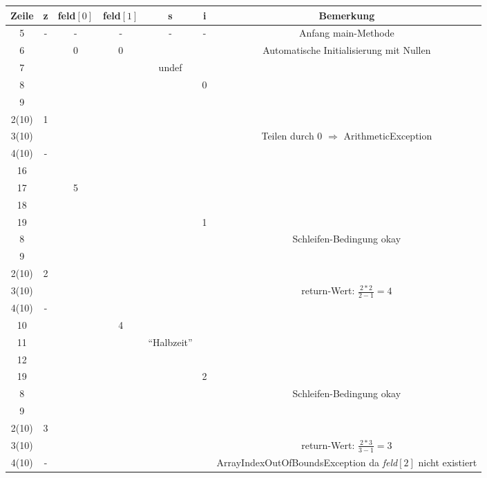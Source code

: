\documentclass{scrartcl}
\begin{document}
\begin{center}
\begin{tabular}{ccccccc} %
	\toprule
	Zeile	& z	& feld$\left[0\right]$	& feld$\left[1\right]$	& s				& i	& Bemerkung\\
	\midrule
	5		& -	& -						& -						& -				& -	& Anfang main-Methode\\
	6		& 	& 0						& 0						& 				& 	& Automatische Initialisierung mit Nullen\\
	7		&	&						&						& undef			&	& \\
	8		&	&						&						&				& 0	& \\
	9		&	&						&						&				&	& \\ %
	\midrule
	2(10)	& 1	&						&						&				&	& \\
	3(10)	&	&						&						&				&	& Teilen durch 0 $\Rightarrow$ ArithmeticException\\
	4(10)	& -	&						&						&				&	& \\
	\midrule
	16		&	&						&						&				&	& \\
	17		&	& 5						&						&				&	& \\
	18		&	&						&						&				&	& \\
	19		&	&						&						&				& 1	& \\
	8		&	&						&						&				&	& Schleifen-Bedingung okay\\
	9		&	&						&						&				&	& \\ %
	\midrule
	2(10)	& 2	&						&						&				&	& \\
	3(10)	&	&						&						&				&	& return-Wert: $\frac{2*2}{2-1}=4$\\
	4(10)	& -	&						&						&				&	& \\
	\midrule
	10		& 	&						& 4						&				&	& \\
	11		&	&						&						& \enquote{Halbzeit}	&	& \\
	12		&	&						&						&				&	& \\
	19		&	&						&						&				& 2	& \\
	8		&	&						&						&				&	& Schleifen-Bedingung okay\\
	9		&	&						&						&				&	& \\ %
	\midrule
	2(10)	& 3	&						&						&				&	& \\
	3(10)	&	&						&						&				&	& return-Wert: $\frac{2*3}{3-1}=3$\\
	4(10)	& -	&						&						&				&	& \multirow{2}{4cm}{ArrayIndexOutOfBoundsException da \emph{feld$\left[2\right]$} nicht existiert}\\

\end{tabular}
\end{center}
\end{document}
